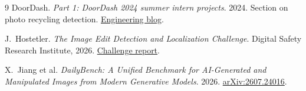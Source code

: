 \documentclass{article}
\begin{document}
\begin{thebibliography}{9}
\small
{}
DoorDash. \emph{Part 1: DoorDash 2024 summer intern projects}. 2024. Section on photo recycling detection. \href{https://careersatdoordash.com/blog/part-1-doordash-2024-summer-intern-projects/}{Engineering blog}.

J.~Hostetler. \emph{The Image Edit Detection and Localization Challenge}. Digital Safety Research Institute, 2026. \href{https://dsri.org/blog/the-image-edit-detection-and-localization-challenge/}{Challenge report}.

X.~Jiang et al. \emph{DailyBench: A Unified Benchmark for AI-Generated and Manipulated Images from Modern Generative Models}. 2026. \href{https://arxiv.org/abs/2607.24016}{arXiv:2607.24016}.

\end{thebibliography}
\end{document}
